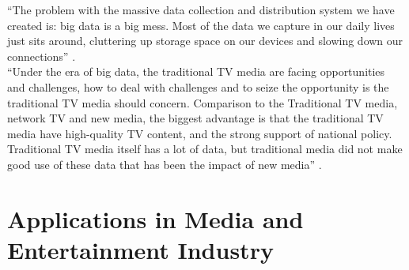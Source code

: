 \documentclass[sigconf]{acmart}
\begin{document}
``The problem with the massive data collection and distribution system we have created is: big data is a big mess. Most of the data we capture in our daily lives just sits around, cluttering up storage space on our devices and slowing down our connections'' \cite{Schlieski2012data}. \\
``Under the era of big data, the traditional TV media are facing opportunities and challenges, how to deal with challenges and to seize the opportunity is the traditional TV media should concern. Comparison to the Traditional TV media, network TV and new media, the biggest advantage is that the traditional TV media have high-quality TV content, and the strong support of national policy. Traditional TV media itself has a lot of data, but traditional media did not make good use of these data that has been the impact of new media'' \cite{Zhang2017era}.

\section{Applications in Media and Entertainment Industry}
\end{document}
